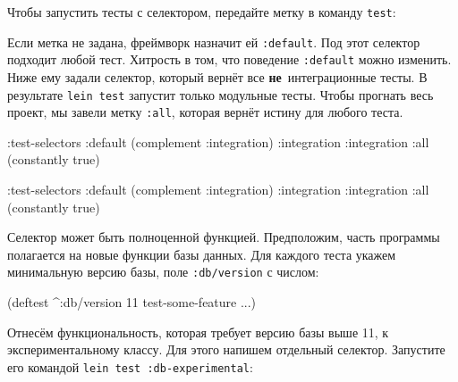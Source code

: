 \noindent
Чтобы запустить тесты с селектором, передайте метку в команду \verb|test|:

\begin{english}
\end{english}


Если метка не задана, фреймворк назначит ей \verb|:default|. Под этот селектор
подходит любой тест. Хитрость в том, что поведение \verb|:default| можно
изменить. Ниже ему задали селектор, который вернёт все
\textbf{не}~интеграционные тесты. В результате \verb|lein test| запустит только
модульные тесты. Чтобы прогнать весь проект, мы завели метку \verb|:all|,
которая вернёт истину для любого теста.

\ifnarrow

\begin{english}
  \begin{clojure}
:test-selectors
  {:default (complement :integration)
   :integration :integration
   :all (constantly true)}
  \end{clojure}
\end{english}

\else

\begin{english}
  \begin{clojure}
:test-selectors {:default (complement :integration)
                 :integration :integration
                 :all (constantly true)}
  \end{clojure}
\end{english}

\fi

Селектор может быть полноценной функцией. Предположим, часть программы
полагается на новые функции базы данных. Для каждого теста укажем минимальную
версию базы, поле \verb|:db/version| с числом:

\begin{english}
  \begin{clojure}
(deftest ^{:db/version 11}
  test-some-feature
  ...)
  \end{clojure}
\end{english}

Отнесём функциональность, которая требует версию базы выше 11, к
экспериментальному классу. Для этого напишем отдельный селектор. Запустите его
командой \texttt{lein test :db-experi\-men\-tal}:

